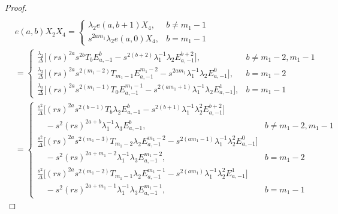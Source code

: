 \documentclass[10pt,a4paper]{amsart}
\begin{document}
\begin{proof}
\begin{align*}
        \end{align*}
       \begin{align*}
          &e(a,b)X_2X_4  = 
    \begin{cases}
        \lambda_2 e(a,b+1)X_4, & b \neq m_1 - 1 \\[3pt]
        s^{2 a m_1} \lambda_2 e(a,0)X_4, & b = m_1 - 1
    \end{cases}\\[3pt]
        &=\begin{cases}
        \displaystyle \frac{\lambda_2}{\Delta} \Bigg[ 
            (rs)^{2a} s^{2b} T_b 
            E^{b}_{a,-1}- s^{2(b+2)} \lambda_1^{-1} \lambda_2 E^{b+2}_{a,-1}  
        \Bigg],  
        &  b \neq m_1-2, m_1 - 1 \\[15pt]
\displaystyle\frac{\lambda_2}{\Delta} \Bigg[ 
            (rs)^{2a} s^{2(m_1 - 2)} T_{m_1-1}  
           E^{m_1-2}_{a,-1} - s^{2 a m_1} \lambda_1^{-1} \lambda_2 E^{0}_{a,-1}  
        \Bigg],  
        & b = m_1 - 2  \\[15pt]
\displaystyle\frac{\lambda_2}{\Delta} \Bigg[ 
            (rs)^{2a}  
            s^{2(m_1-1)} T_0E^{m_1-1}_{a,-1}  
            - s^{2(am_1+1)} \lambda_1^{-1} \lambda_2 E^{1}_{a,-1}  
        \Bigg],  
        &  b = m_1-1
    \end{cases}\\[3pt]
        &=\begin{cases}
    \displaystyle \frac{s^2}{\Delta} \Bigg[ 
            (rs)^{2a} s^{2(b-1)} T_b  
            \lambda_2E^{b}_{a,-1}- s^{2(b+1)} \lambda_1^{-1} \lambda_2^2 E^{b+2}_{a,-1}\Bigg]\\ \quad -s^2(rs)^{2a+b}\lambda_1^{-1}\lambda_3E^{b}_{a,-1},  
        &  b \neq m_1-2, m_1 - 1 \\[3pt]
\displaystyle\frac{s^2}{\Delta} \Bigg[ 
            (rs)^{2a} s^{2(m_1 - 3)} T_{m_1-2}
            \lambda_2E^{m_1-2}_{a,-1} - s^{2 (a m_1-1)} \lambda_1^{-1} \lambda_2^2 E^{0}_{a,-1}  
        \Bigg]\\ \quad -s^2(rs)^{2a+m_1-2}\lambda_1^{-1}\lambda_3E^{m_1-2}_{a,-1},  
        & b = m_1 - 2  \\[3pt]
\displaystyle\frac{s^2}{\Delta} \Bigg[ 
            (rs)^{2a}s^{2(m_1-2)}  T_{m_1-1} 
             \lambda_2E^{m_1-1}_{a,-1} 
- s^{2(am_1)} \lambda_1^{-1} \lambda_2^2 E^{1}_{a,-1}\Bigg]\\ \quad -s^2(rs)^{2a+m_1-1}\lambda_1^{-1}\lambda_3E^{m_1-1}_{a,-1},  
        &  b = m_1-1    
    \end{cases}\end{align*}

\end{proof}
\end{document}
